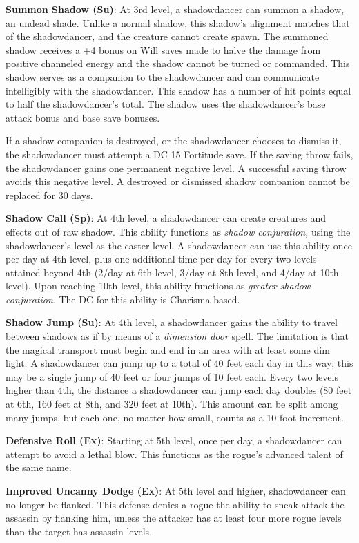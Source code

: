 \textbf{Summon Shadow (Su)}: At 3rd level, a shadowdancer can summon a shadow, an undead shade. Unlike a normal shadow, this shadow's alignment matches that of the shadowdancer, and the creature cannot create spawn. The summoned shadow receives a +4 bonus on Will saves made to halve the damage from positive channeled energy and the shadow cannot be turned or commanded. This shadow serves as a companion to the shadowdancer and can communicate intelligibly with the shadowdancer. This shadow has a number of hit points equal to half the shadowdancer's total. The shadow uses the shadowdancer's base attack bonus and base save bonuses.
				
If a shadow companion is destroyed, or the shadowdancer chooses to dismiss it, the shadowdancer must attempt a DC 15 Fortitude save. If the saving throw fails, the shadowdancer gains one permanent negative level. A successful saving throw avoids this negative level. A destroyed or dismissed shadow companion cannot be replaced for 30 days.
				
\textbf{Shadow Call (Sp)}: At 4th level, a shadowdancer can create creatures and effects out of raw shadow. This ability functions as \textit{shadow conjuration,} using the shadowdancer's level as the caster level. A shadowdancer can use this ability once per day at 4th level, plus one additional time per day for every two levels attained beyond 4th (2/day at 6th level, 3/day at 8th level, and 4/day at 10th level). Upon reaching 10th level, this ability functions as \textit{greater shadow conjuration}. The DC for this ability is Charisma-based.
				
\textbf{Shadow Jump (Su)}: At 4th level, a shadowdancer gains the ability to travel between shadows as if by means of a \textit{dimension door }spell. The limitation is that the magical transport must begin and end in an area with at least some dim light. A shadowdancer can jump up to a total of 40 feet each day in this way; this may be a single jump of 40 feet or four jumps of 10 feet each. Every two levels higher than 4th, the distance a shadowdancer can jump each day doubles (80 feet at 6th, 160 feet at 8th, and 320 feet at 10th). This amount can be split among many jumps, but each one, no matter how small, counts as a 10-foot increment.
				
\textbf{Defensive Roll (Ex)}: Starting at 5th level, once per day, a shadowdancer can attempt to avoid a lethal blow. This functions as the rogue's advanced talent of the same name.
				
\textbf{Improved Uncanny Dodge (Ex)}: At 5th level and higher, shadowdancer can no longer be flanked. This defense denies a rogue the ability to sneak attack the assassin by flanking him, unless the attacker has at least four more rogue levels than the target has assassin levels.
				
